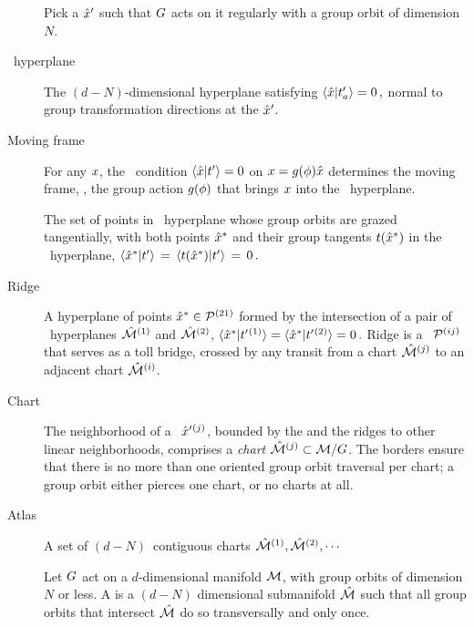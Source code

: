 \documentclass[aip,cha,reprint,
secnumarabic,
nofootinbib, tightenlines,
nobibnotes, showkeys, showpacs,
groupedaddress
]{revtex4-1}
\begin{document}
\begin{description}

\item[\Template]
Pick a {\template} ${\hat{x}'}$ such that $G$ acts on it
regularly with a group orbit of dimension $N$.

\item[\Slice\ hyperplane]
The $(d\!-\!N)$-dimensional hyperplane satisfying
\( %
\braket{\sspRed}{\sliceTan{a}}=0
\,,
\) %
normal to group transformation directions at the {\template} ${\hat{x}'}$.

\item[Moving frame]
For any $x$, the \slice\ condition $\braket{\sspRed}{\sliceTan{}}=0$
on $x = g({\bf \phi})\hat{x}$ determines the moving frame, \ie, the
group action $g({\bf \phi})$ that brings $ x$ into the \slice\
hyperplane.

\item[\ChartBord]
The set of points in \slice\ hyperplane whose group orbits are grazed
tangentially, with both points $\hat{x}^\ast$ and their group tangents
$t(\hat{x}^\ast)$  in the \slice\ hyperplane,
$\braket{\sspRSing}{\sliceTan{}} \,=\,
\braket{\groupTan(\sspRSing)}{\sliceTan{}} \,=\, 0 \,.$


\item[Ridge]
A hyperplane of points $\hat{x}^* \in {\cal P}{}^{(21)}$ formed by the
intersection of a pair of \slice\ hyperplanes $\hat{\cal M}{}^{(1)}$ and
$\hat{\cal M}{}^{(2)}$,
\(
\braket{\sspRed^*}{\sliceTan{}{}^{(1)}} =
\braket{\sspRed^*}{\sliceTan{}{}^{(2)}} = 0
    \,.
\) %
Ridge is a \PoincSec\ ${\cal P}{}^{(ij)}$ that serves as a toll bridge,
crossed by any transit from a chart $\hat{\cal M}{}^{(j)}$ to an adjacent chart
$\hat{\cal M}{}^{(i)}$.

\item[Chart]
The neighborhood of a \template\ ${\hat{x}'}{}^{(j)}$, bounded by the
{\chartBord} and the ridges to other linear neighborhoods, comprises
a \emph{chart} $\hat{\cal M}{}^{(j)} \subset {\cal M}/G$. The borders ensure
that there is no more than one oriented group orbit traversal per chart;
a group orbit either pierces one chart, or no charts at all.

\item[Atlas]
A set of $(d\!-\!N)$\dmn\ contiguous charts $\hat{\cal M}{}^{(1)},
\hat{\cal M}{}^{(2)}, \cdots$

\item[\Slice]
Let $G$ act on a $d$-dimensional manifold ${\cal M}$, with group
orbits of dimension $N$ or less. A \emph{\slice} is a $(d\!-\!N)$
dimensional submanifold $\hat{\cal M}$ such that all group orbits that
intersect $\hat{\cal M}$ do so transversally and only once.

\end{description}
\end{document}
